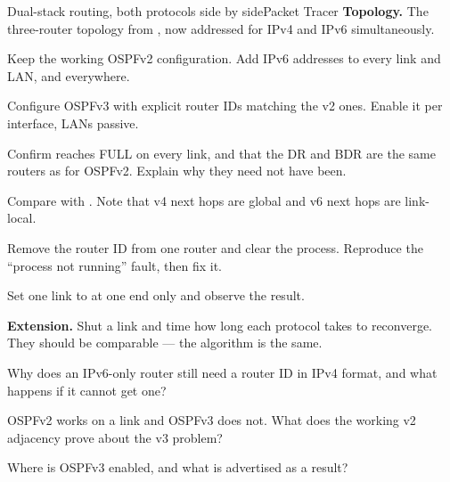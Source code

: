 \begin{lab}{Dual-stack routing, both protocols side by side}{Packet Tracer}
\textbf{Topology.} The three-router topology from , now addressed for
IPv4 and IPv6 simultaneously.

\begin{tasks}
  \item Keep the working OSPFv2 configuration. Add IPv6 addresses to every link
        and LAN, and  everywhere.
  \item Configure OSPFv3 with explicit router IDs matching the v2 ones. Enable it
        per interface, LANs passive.
  \item Confirm  reaches FULL on every link, and
        that the DR and BDR are the same routers as for OSPFv2. Explain why they
        need not have been.
  \item Compare  with . Note
        that v4 next hops are global and v6 next hops are link-local.
  \item Remove the router ID from one router and clear the process. Reproduce the
        ``process not running'' fault, then fix it.
  \item Set one link to  at one end only and
        observe the result.
  \item \textbf{Extension.} Shut a link and time how long each protocol takes to
        reconverge. They should be comparable --- the algorithm is the same.
\end{tasks}
\end{lab}

\begin{checkpoint}
\begin{tightnum}
  \item Why does an IPv6-only router still need a router ID in IPv4 format, and
        what happens if it cannot get one?
  \item OSPFv2 works on a link and OSPFv3 does not. What does the working v2
        adjacency prove about the v3 problem?
  \item Where is OSPFv3 enabled, and what is advertised as a result?
\end{tightnum}
\end{checkpoint}

